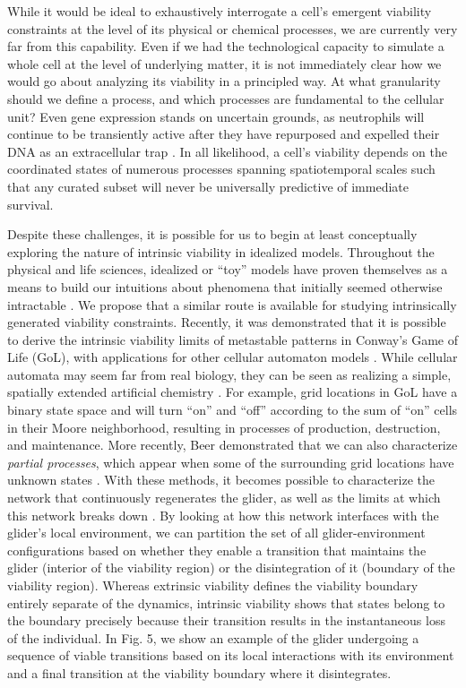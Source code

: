 \documentclass{article}
\begin{document}
While it would be ideal to exhaustively interrogate a cell's emergent viability constraints at the level of its physical or chemical processes, we are currently very far from this capability. Even if we had the technological capacity to simulate a whole cell at the level of underlying matter, it is not immediately clear how we would go about analyzing its viability in a principled way. At what granularity should we define a process, and which processes are fundamental to the cellular unit? Even gene expression stands on uncertain grounds, as neutrophils will continue to be transiently active after they have repurposed and expelled their DNA as an extracellular trap \cite{desai_matters_2016}. In all likelihood, a cell’s viability depends on the coordinated states of numerous processes spanning spatiotemporal scales such that any curated subset will never be universally predictive of immediate survival.

Despite these challenges, it is possible for us to begin at least conceptually exploring the nature of intrinsic viability in idealized models. Throughout the physical and life sciences, idealized or “toy” models have proven themselves as a means to build our intuitions about phenomena that initially seemed otherwise intractable \cite{beer_animals_2009,beer_milking_2024}. We propose that a similar route is available for studying intrinsically generated viability constraints. Recently, it was demonstrated that it is possible to derive the intrinsic viability limits of metastable patterns in Conway’s Game of Life (GoL), with applications for other cellular automaton models \cite{beer_deriving_2024}. While cellular automata may seem far from real biology, they can be seen as realizing a simple, spatially extended artificial chemistry \cite{dittrich_artificial_2001,beer_characterizing_2015}. For example, grid locations in GoL have a binary state space and will turn “on” and “off” according to the sum of “on” cells in their Moore neighborhood, resulting in processes of production, destruction, and maintenance. More recently, Beer demonstrated that we can also characterize \textit{partial processes}, which appear when some of the surrounding grid locations have unknown states \cite{beer_integrated_2020}. With these methods, it becomes possible to characterize the network that continuously regenerates the glider, as well as the limits at which this network breaks down \cite{beer_integrated_2020,beer_deriving_2024}. By looking at how this network interfaces with the glider’s local environment, we can partition the set of all glider-environment configurations based on whether they enable a transition that maintains the glider (interior of the viability region) or the disintegration of it (boundary of the viability region). Whereas extrinsic viability defines the viability boundary entirely separate of the dynamics, intrinsic viability shows that states belong to the boundary precisely because their transition results in the instantaneous loss of the individual. In Fig. 5, we show an example of the glider undergoing a sequence of viable transitions based on its local interactions with its environment and a final transition at the viability boundary where it disintegrates.  
\end{document}
